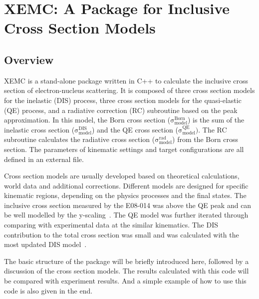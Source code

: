\chapter{XEMC: A Package for Inclusive Cross Section Models}

\section{Overview}
 XEMC is a stand-alone package written in C++ to calculate the inclusive cross section of electron-nucleus scattering. It is composed of three cross section models for the inelastic (DIS) process, three cross section models for the quasi-elastic (QE) process, and a radiative correction (RC) subroutine based on the peak approximation. In this model, the Born cross section ($\mathrm{\sigma^{Born}_{model}}$) is the sum of the inelastic cross section ($\mathrm{\sigma^{DIS}_{model}}$) and the QE cross section ($\mathrm{\sigma^{QE}_{model}})$. The RC subroutine calculates the radiative cross section ($\mathrm{\sigma^{rad}_{model}}$) from the Born cross section. The parameters of kinematic settings and target configurations are all defined in an external file.
 
 Cross section models are usually developed based on theoretical calculations, world data and additional corrections. Different models are designed for specific kinematic regions, depending on the physics processes and the final states. The inclusive cross section measured by the E08-014 was above the QE peak and can be well modelled by the y-scaling~\cite{West1975263,PhysRevC.41.R2474,Boffi19931,john_thesis}. The QE model was further iterated through comparing with experimental data at the similar kinematics. The DIS contribution to the total cross section was small and was calculated with the most updated DIS model~\cite{Bosted:2012qc}. 
  
  The basic structure of the package will be briefly introduced here, followed by a discussion of the cross section models. The results calculated with this code will be compared with experiment results. And a simple example of how to use this code is also given in the end. 
  
